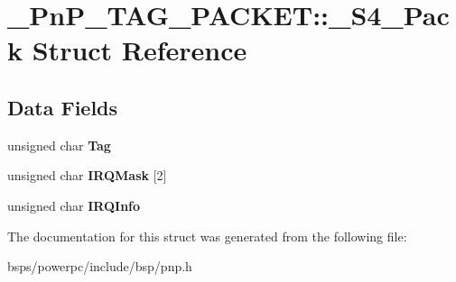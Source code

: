 \hypertarget{struct__PnP__TAG__PACKET_1_1__S4__Pack}{}\section{\+\_\+\+Pn\+P\+\_\+\+T\+A\+G\+\_\+\+P\+A\+C\+K\+ET\+::\+\_\+\+S4\+\_\+\+Pack Struct Reference}
\label{struct__PnP__TAG__PACKET_1_1__S4__Pack}
\subsection*{Data Fields}
\begin{DoxyCompactItemize}
\item 
\mbox{\label{struct__PnP__TAG__PACKET_1_1__S4__Pack_ad48ebeab9a47bf1d30867393ca8551c8}} 
unsigned char {\bfseries Tag}
\item 
\mbox{\label{struct__PnP__TAG__PACKET_1_1__S4__Pack_ad3a901296d2b494790f0c84a743e7c30}} 
unsigned char {\bfseries I\+R\+Q\+Mask} \mbox{[}2\mbox{]}
\item 
\mbox{\label{struct__PnP__TAG__PACKET_1_1__S4__Pack_aa586afce3fe07ef7bfbe7eb34f99a57d}} 
unsigned char {\bfseries I\+R\+Q\+Info}
\end{DoxyCompactItemize}


The documentation for this struct was generated from the following file\+:\begin{DoxyCompactItemize}
\item 
bsps/powerpc/include/bsp/pnp.\+h\end{DoxyCompactItemize}
